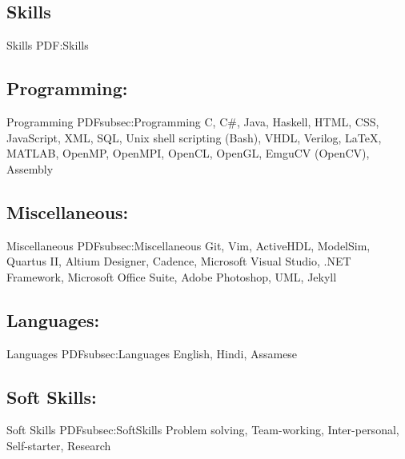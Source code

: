 \documentclass[a4paper,10pt,oneside]{article}
\begin{document}
\begin{body}



\section
{Skills}
{Skills}
{PDF:Skills}
\subsection
{Programming:}
{Programming}
{PDFsubsec:Programming}
C, C\#, Java, Haskell, HTML, CSS, JavaScript, XML, SQL, Unix shell scripting (Bash), VHDL, Verilog, {\LaTeX}, MATLAB, OpenMP, OpenMPI, OpenCL, OpenGL, EmguCV (OpenCV), Assembly
\vspace{15pt}
\subsection
{Miscellaneous:}
{Miscellaneous}
{PDFsubsec:Miscellaneous}
Git, Vim, ActiveHDL, ModelSim, Quartus II, Altium Designer, Cadence, Microsoft Visual Studio, .NET Framework, Microsoft Office Suite, Adobe Photoshop, UML, Jekyll
\vspace{15pt}
\subsection
{Languages:}
{Languages}
{PDFsubsec:Languages}
English, Hindi, Assamese
\vspace{15pt}
\subsection
{Soft Skills:}
{Soft Skills}
{PDFsubsec:SoftSkills}
Problem solving, Team-working, Inter-personal, Self-starter, Research

\vspace{-5pt}
\hline



\end{body}
\end{document}
